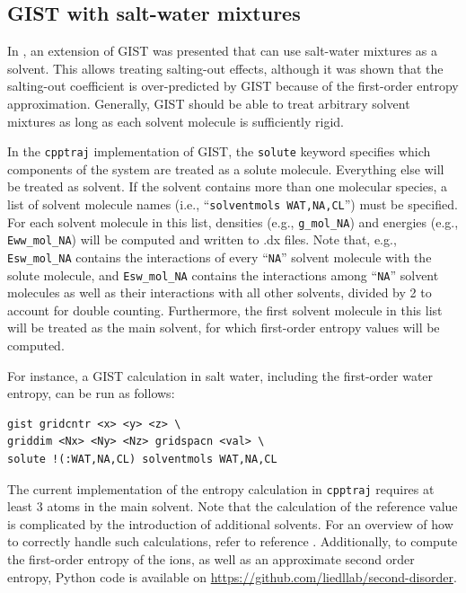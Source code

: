 \documentclass[9pt,tutorial]{livecoms}
\newcommand{\software}{\texttt}
\newcommand\inlinecode{\texttt}
\begin{document}
\subsection{GIST with salt-water mixtures}
\label{sec-salt-water}
In \cite{Waibl2021-gist-salt}, an extension of GIST was presented that can use salt-water mixtures as a solvent.
This allows treating salting-out effects, although it was shown that the salting-out coefficient is over-predicted by GIST because of the first-order entropy approximation.
Generally, GIST should be able to treat arbitrary solvent mixtures as long as each solvent molecule is sufficiently rigid.

In the \software{cpptraj} implementation of GIST, the \inlinecode{solute} keyword specifies which components of the system are treated as a solute molecule.
Everything else will be treated as solvent.
If the solvent contains more than one molecular species, a list of solvent molecule names (i.e., ``\inlinecode{solventmols WAT,NA,CL}'') must be specified.
For each solvent molecule in this list, densities (e.g., \inlinecode{g\_mol\_NA}) and energies (e.g., \inlinecode{Eww\_mol\_NA}) will be computed and written to .dx files.
Note that, e.g., \inlinecode{Esw\_mol\_NA} contains the interactions of every ``\inlinecode{NA}'' solvent molecule with the solute molecule, and \inlinecode{Esw\_mol\_NA} contains the interactions among ``\inlinecode{NA}'' solvent molecules as well as their interactions with all other solvents, divided by 2 to account for double counting.
Furthermore, the first solvent molecule in this list will be treated as the main solvent, for which first-order entropy values will be computed.

For instance, a GIST calculation in salt water, including the first-order water entropy, can be run as follows:

\begin{lstlisting}[style=cpptraj]
gist gridcntr <x> <y> <z> \
griddim <Nx> <Ny> <Nz> gridspacn <val> \
solute !(:WAT,NA,CL) solventmols WAT,NA,CL
\end{lstlisting}

The current implementation of the entropy calculation in \software{cpptraj} requires at least 3 atoms in the main solvent.
Note that the calculation of the reference value is complicated by the introduction of additional solvents.
For an overview of how to correctly handle such calculations, refer to reference \cite{Waibl2021-gist-salt}.
Additionally, to compute the first-order entropy of the ions, as well as an approximate second order entropy, Python code is available on \url{https://github.com/liedllab/second-disorder}.
\end{document}
